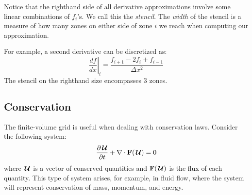 Notice that the righthand side of all derivative approximations involve
some linear combinations of $f_i$'s.  We call this the {\em stencil}.
The {\em width} of the stencil is a measure of how many zones on
either side of zone $i$ we reach when computing our approximation.

For example, a second derivative can be discretized as:
\begin{equation}
\left . \frac{df}{dx} \right |_i = \frac{f_{i+1} - 2 f_i + f_{i-1}}{\Delta x^2}
\end{equation}
The stencil on the righthand size encompasses 3 zones.

\subsection{Conservation}

The finite-volume grid is useful when dealing with conservation laws.
Consider the following system:
\begin{equation}
\frac{\partial {\,\boldsymbol{\mathcal{U}}}}{\partial t} + \nabla \cdot {\bf F}({\,\boldsymbol{\mathcal{U}}}) = 0
\end{equation}
where ${\,\boldsymbol{\mathcal{U}}}$ is a vector of conserved quantities and ${\bf F}({\,\boldsymbol{\mathcal{U}}})$ is the flux
of each quantity.  This type of system arises, for example, in fluid
flow, where the system will represent conservation of mass, momentum,
and energy.

